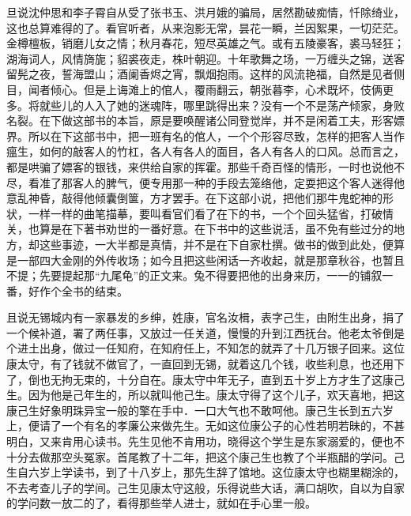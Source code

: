 \documentclass[12pt,UTF8]{ctexbook}
\begin{document}
{{{旦说沈仲思和李子霄自从受了张书玉、洪月娥的骗局，居然勘破痴情，忏除绮业，这也总算难得的了。看官听者，从来泡影无常，昙花一瞬，兰因絮果，一切茫茫。金樽檀板，销磨儿女之情；秋月春花，短尽英雄之气。或有五陵豪客，裘马轻狂；湖海词人，风情旖旎；貂裘夜走，株叶朝迎。十年歌舞之场，一万缠头之锦，送客留髡之夜，誓海盟山；酒阑香烬之宵，飘烟抱雨。这样的风流艳福，自然是见者侧目，闻者倾心。但是上诲滩上的倌人，覆雨翻云，朝张暮李，心术既坏，伎俩更多。将就些儿的人入了她的迷魂阵，哪里跳得出来？没有一个不是荡产倾家，身败名裂。在下做这部书的本旨，原是要唤醒诸公同登觉岸，并不是闲着工夫，形客嫖界。所以在下这部书中，把一班有名的倌人，一个个形容尽致，怎样的把客人当作瘟生，如何的敲客人的竹杠，各人有各人的面目，各人有各人的口风。总而言之，都是哄骗了嫖客的银钱，来供给自家的挥霍。那些千奇百怪的情形，一时也说他不尽，看准了那客人的脾气，便专用那一种的手段去笼络他，定耍把这个客人迷得他意乱神昏，敲得他倾囊倒箧，方才罢手。在下这部小说，把他们那牛鬼蛇神的形状，一样一样的曲笔描摹，要叫看官们看了在下的书，一个个回头猛省，打破情关，也算是在下著书劝世的一番好意。在下书中的这些说活，虽不免有些过分的地方，却这些事迹，一大半都是真情，并不是在下自家杜撰。做书的做到此处，便算是一部四大金刚的外传收场；如今且把这些闲话一齐收起，就是那章秋谷，也暂且不提；先要提起那“九尾龟”的正文来。兔不得要把他的出身来历，一一的铺叙一番，好作个全书的结束。

且说无锡城内有一家暴发的乡绅，姓康，官名汝楫，表字己生，由附生出身，捐了一个候补道，署了两任事，又放过一任关道，慢慢的升到江西抚台。他老太爷倒是个进土出身，做过一任知府，在知府任上，不知怎的就弄了十几万银子回来。这位康太守，有了钱就不做官了，一直回到无锡，就着这几个钱，收些利息，也还用下了，倒也无拘无束的，十分自在。康太守中年无子，直到五十岁上方才生了这康己生。因为他是己年生的，所以就叫他己生。康太守得了这个儿子，欢天喜地，把这康己生好象明珠异宝一般的擎在手中．一口大气也不敢呵他。康己生长到五六岁上，便请了一个有名的孝廉公来做先生。无如这位康公子的心性若明若昧的，不甚明白，又来肯用心读书。先生见他不肯用功，晓得这个学生是东家溺爱的，便也不十分去做那空头冤家。首尾教了十二年，把这个康己生也教了个半瓶醋的学问。己生自六岁上学读书，到了十八岁上，那先生辞了馆地。这位康太守也糊里糊涂的，不去考查儿子的学间。己生见康太守这般，乐得说些大话，满口胡吹，自以为自家的学问数一放二的了，看得那些举人进士，就如在手心里一般。

}}}
\end{document}
